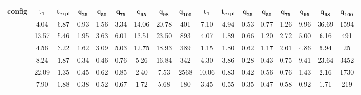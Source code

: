 \begin{landscape}
\begin{table}[!h]
\begin{adjustbox}{max width=1.4\textwidth}
\begin{tabular}{r|c|c|cccccc|c|c|cccccc}
				\textbf{config}          & $\mathbf{\overline{t_{1}}}$ & $\mathbf{\overline{t_{expl}}}$ &  $\mathbf{q_{25}}$ &  $\mathbf{q_{50}}$ &  $\mathbf{q_{75}}$  & $\mathbf{q_{95}}$ &  $\mathbf{q_{98}}$ & $\mathbf{q_{100}}$ &$\mathbf{\overline{t_{1}}}$  & $\mathbf{\overline{t_{expl}}}$ &  $\mathbf{q_{25}}$ &  $\mathbf{q_{50}}$ &  $\mathbf{q_{75}}$  & $\mathbf{q_{95}}$ &  $\mathbf{q_{98}}$ & $\mathbf{q_{100}}$ \\ \midrule
				\comus          &               4.04 &                  6.87 &      0.93 &      1.56 &       3.34 &    14.06 &     20.78 &    401 &  7.10 &        4.94 &  0.53 &  0.77 &  1.26 &  9.96 & 36.69 & 1594   \\
				\comusbound     &           13.57 &           5.46           &      1.95 &      3.63 &       6.01 &    13.51 &     23.50 &    893 &  4.07 &        1.89 &  0.66 &  1.20 &  2.72 &  5.00 &  6.16 &  491   \\
				\ousbiter       &               4.56 &                  3.22 &      1.62 &      3.09 &       5.03 &    12.75 &     18.93 &    389 &  1.15 &        1.80 &  0.62 &  1.17 &  2.61 &  4.86 &  5.94 &   25   \\ \hline
				\comusincr      &               8.24 &                  1.87 &      0.34 &      0.46 &       0.76 &     5.26 &     16.84 &    342 &  4.30 &        3.86 &  0.28 &  0.43 &  0.75 &  9.41 & 23.64 & 3452   \\
				\ousbincr       &              22.09 &                  1.35 &      0.45 &      0.62 &       0.85 &     2.40 &      7.53 &   2568 & 10.06 &        0.83 &  0.42 &  0.56 &  0.76 &  1.43 &  2.16 & 1730   \\ 
				\ousbiterincr   &               7.90 &                  0.88 &      0.38 &      0.52 &       0.67 &     1.72 &      5.68 &    180 &  3.45 &        0.55 &  0.35 &  0.47 &  0.58 &  0.92 &  1.71 &  219   \\
				

\end{tabular}
\end{adjustbox}
\end{table}
\end{landscape}
